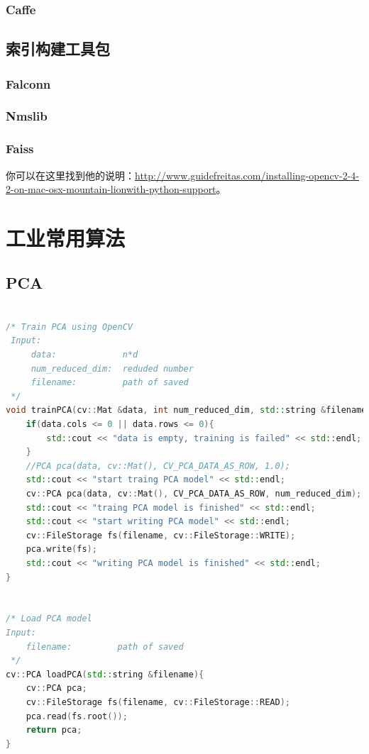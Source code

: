 \documentclass[color=cyan,mathpazo,titlestyle=hang]{elegantbook}
\begin{document}
\subsection{Caffe}

\section{索引构建工具包}

\subsection{Falconn}

\subsection{Nmslib}

\subsection{Faiss}

你可以在这里找到他的说明：\href{http://www.guidefreitas.com/installing-opencv-2-4-2-on-mac-osx-mountain-lionwith-python-support}{http://www.guidefreitas.com/installing-opencv-2-4-2-on-mac-osx-mountain-lionwith-python-support}。

\chapter{工业常用算法}

\section{PCA}

\begin{lstlisting}[language=c++]

/* Train PCA using OpenCV
 Input:
     data:             n*d
     num_reduced_dim:  reduded number
     filename:         path of saved
 */
void trainPCA(cv::Mat &data, int num_reduced_dim, std::string &filename){
    if(data.cols <= 0 || data.rows <= 0){
        std::cout << "data is empty, training is failed" << std::endl;
    }
    //PCA pca(data, cv::Mat(), CV_PCA_DATA_AS_ROW, 1.0);
    std::cout << "start traing PCA model" << std::endl;
    cv::PCA pca(data, cv::Mat(), CV_PCA_DATA_AS_ROW, num_reduced_dim);
    std::cout << "traing PCA model is finished" << std::endl;
    std::cout << "start writing PCA model" << std::endl;
    cv::FileStorage fs(filename, cv::FileStorage::WRITE);
    pca.write(fs);
    std::cout << "writing PCA model is finished" << std::endl;
}


/* Load PCA model
Input:
    filename:         path of saved
 */
cv::PCA loadPCA(std::string &filename){
    cv::PCA pca;
    cv::FileStorage fs(filename, cv::FileStorage::READ);
    pca.read(fs.root());
    return pca;
}
\end{lstlisting}
\end{document}
